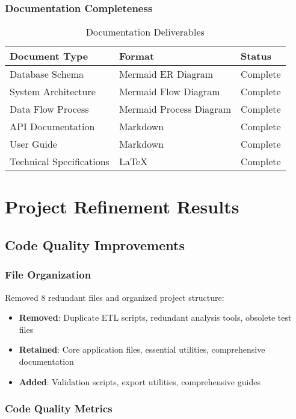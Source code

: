 \documentclass[12pt,a4paper]{article}
\begin{document}
\subsubsection{Documentation Completeness}

\begin{table}[H]
\centering
\caption{Documentation Deliverables}
\begin{tabular}{@{}lll@{}}
\toprule
\textbf{Document Type} & \textbf{Format} & \textbf{Status} \\
\midrule
Database Schema & Mermaid ER Diagram & Complete \\
System Architecture & Mermaid Flow Diagram & Complete \\
Data Flow Process & Mermaid Process Diagram & Complete \\
API Documentation & Markdown & Complete \\
User Guide & Markdown & Complete \\
Technical Specifications & LaTeX & Complete \\
\bottomrule
\end{tabular}
\end{table}

\section{Project Refinement Results}

\subsection{Code Quality Improvements}

\subsubsection{File Organization}
Removed 8 redundant files and organized project structure:

\begin{itemize}
    \item \textbf{Removed}: Duplicate ETL scripts, redundant analysis tools, obsolete test files
    \item \textbf{Retained}: Core application files, essential utilities, comprehensive documentation
    \item \textbf{Added}: Validation scripts, export utilities, comprehensive guides
\end{itemize}

\subsubsection{Code Quality Metrics}
\end{document}
